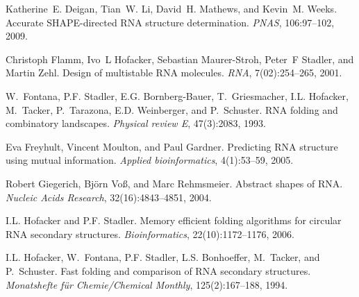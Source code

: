 \begin{DoxyDescription}
\item[\label{citelist_CITEREF_deigan:2009}%
\Hypertarget{citelist_CITEREF_deigan:2009}%
\mbox{[}8\mbox{]}]Katherine~E. Deigan, Tian~W. Li, David~H. Mathews, and Kevin~M. Weeks. Accurate SHAPE-\/directed RNA structure determination. {\itshape PNAS}, 106\+:97--102, 2009.


\item[\label{citelist_CITEREF_flamm:2001}%
\Hypertarget{citelist_CITEREF_flamm:2001}%
\mbox{[}9\mbox{]}]Christoph Flamm, Ivo~L Hofacker, Sebastian Maurer-\/\+Stroh, Peter~F Stadler, and Martin Zehl. Design of multistable RNA molecules. {\itshape RNA}, 7(02)\+:254--265, 2001.


\item[\label{citelist_CITEREF_fontana:1993b}%
\Hypertarget{citelist_CITEREF_fontana:1993b}%
\mbox{[}10\mbox{]}]W.~Fontana, P.\+F. Stadler, E.\+G. Bornberg-\/\+Bauer, T.~Griesmacher, I.\+L. Hofacker, M.~Tacker, P.~Tarazona, E.\+D. Weinberger, and P.~Schuster. RNA folding and combinatory landscapes. {\itshape Physical review E}, 47(3)\+:2083, 1993.


\item[\label{citelist_CITEREF_freyhult:2005}%
\Hypertarget{citelist_CITEREF_freyhult:2005}%
\mbox{[}11\mbox{]}]Eva Freyhult, Vincent Moulton, and Paul Gardner. Predicting RNA structure using mutual information. {\itshape Applied bioinformatics}, 4(1)\+:53--59, 2005.


\item[\label{citelist_CITEREF_giegerich:2004}%
\Hypertarget{citelist_CITEREF_giegerich:2004}%
\mbox{[}12\mbox{]}]Robert Giegerich, Bj\"{o}rn Vo{\ss}, and Marc Rehmsmeier. Abstract shapes of RNA. {\itshape Nucleic Acids Research}, 32(16)\+:4843--4851, 2004.


\item[\label{citelist_CITEREF_hofacker:2006}%
\Hypertarget{citelist_CITEREF_hofacker:2006}%
\mbox{[}13\mbox{]}]I.\+L. Hofacker and P.\+F. Stadler. Memory efficient folding algorithms for circular RNA secondary structures. {\itshape Bioinformatics}, 22(10)\+:1172--1176, 2006.


\item[\label{citelist_CITEREF_hofacker:1994}%
\Hypertarget{citelist_CITEREF_hofacker:1994}%
\mbox{[}14\mbox{]}]I.\+L. Hofacker, W.~Fontana, P.\+F. Stadler, L.\+S. Bonhoeffer, M.~Tacker, and P.~Schuster. Fast folding and comparison of RNA secondary structures. {\itshape Monatshefte f\"{u}r Chemie/\+Chemical Monthly}, 125(2)\+:167--188, 1994.



\end{DoxyDescription}
